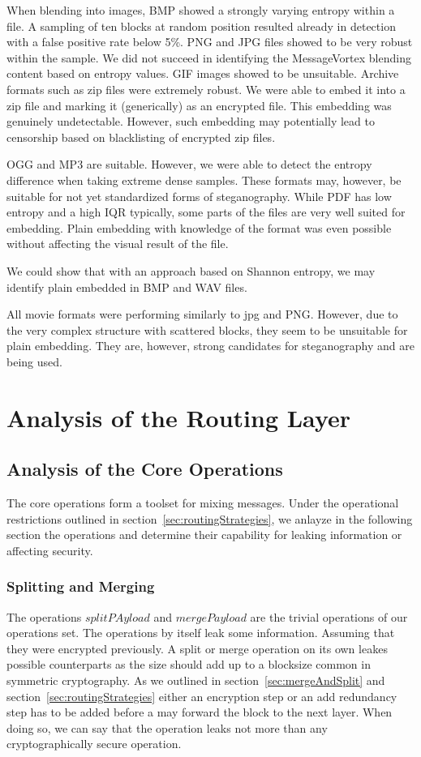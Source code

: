 When blending into images, BMP showed a strongly varying entropy within a file. A sampling of ten blocks at random position resulted already in detection with a false positive rate below 5\%. PNG and JPG files showed to be very robust within the sample. We did not succeed in identifying the MessageVortex blending content based on entropy values. GIF images showed to be unsuitable. Archive formats such as zip files were extremely robust. We were able to embed it into a zip file and marking it (generically) as an encrypted file. This embedding was genuinely undetectable. However, such embedding may potentially lead to censorship based on blacklisting of encrypted zip files.

OGG and MP3 are suitable. However, we were able to detect the entropy difference when taking extreme dense samples. These formats may, however, be suitable for not yet standardized forms of steganography. While PDF has low entropy and a high IQR typically, some parts of the files are very well suited for embedding. Plain embedding with knowledge of the format was even possible without affecting the visual result of the file.

We could show that with an approach based on Shannon entropy, we may identify plain embedded \VortexMessages in BMP and WAV files. 

All movie formats were performing similarly to jpg and PNG. However, due to the very complex structure with scattered blocks, they seem to be unsuitable for plain embedding. They are, however, strong candidates for steganography and are being used.

\section{Analysis of the Routing Layer}
\subsection{Analysis of the Core Operations}
The core operations form a toolset for mixing messages. Under the operational restrictions outlined in section~\ref{sec:routingStrategies}, we anlayze in the following section the operations and determine their capability for leaking information or affecting security.

\subsubsection{Splitting and Merging}
The operations $splitPAyload$ and $mergePayload$ are the trivial operations of our operations set. The operations by itself leak some information. Assuming that they were encrypted previously. A split or merge operation on its own leakes possible counterparts as the size should add up to a blocksize common in symmetric cryptography. As we outlined in section~\ref{sec:mergeAndSplit} and section~\ref{sec:routingStrategies} either an encryption step or an add redundancy step has to be added before a \VortexNode{} may forward the block to the next layer. When doing so, we can say that the operation leaks not more than any cryptographically secure operation.

